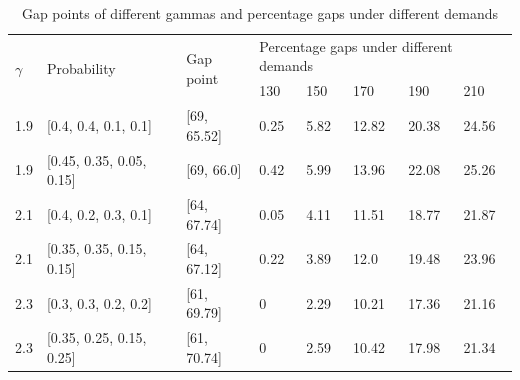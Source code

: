 \begin{table}[]
  \centering
  \caption{Gap points of different gammas and percentage gaps under different demands}
\begin{tabular}{llllllll}
  \hline
  \multicolumn{1}{|l|}{\multirow{2}{*}{$\gamma$}} & \multicolumn{1}{|l|}{\multirow{2}{*}{Probability}} & \multicolumn{1}{l|}{\multirow{2}{*}{Gap point}} & \multicolumn{5}{l|}{Percentage gaps under different demands}   \\ 
  \cline{4-8} 
  \multicolumn{1}{|l|}{} & \multicolumn{1}{l|}{} & \multicolumn{1}{l|}{}  & \multicolumn{1}{l|}{130} & \multicolumn{1}{l|}{150} & \multicolumn{1}{l|}{170} & \multicolumn{1}{l|}{190} & \multicolumn{1}{l|}{210} \\ 
  \hline
  \multicolumn{1}{|l|}{1.9} & \multicolumn{1}{l|}{[0.4, 0.4, 0.1, 0.1]}  & \multicolumn{1}{l|}{[69, 65.52]}  & \multicolumn{1}{l|}{0.25}  & \multicolumn{1}{l|}{5.82}  & \multicolumn{1}{l|}{12.82} & \multicolumn{1}{l|}{20.38} & \multicolumn{1}{l|}{24.56} \\
  \hline
  \multicolumn{1}{|l|}{1.9}  & \multicolumn{1}{l|}{[0.45, 0.35, 0.05, 0.15]}  & \multicolumn{1}{l|}{[69, 66.0]}  & \multicolumn{1}{l|}{0.42}  & \multicolumn{1}{l|}{5.99}  & \multicolumn{1}{l|}{13.96} & \multicolumn{1}{l|}{22.08} & \multicolumn{1}{l|}{25.26} \\ 
  \hline                                    
  \multicolumn{1}{|l|}{2.1}  & \multicolumn{1}{l|}{[0.4, 0.2, 0.3, 0.1]} & \multicolumn{1}{l|}{[64, 67.74]}  & \multicolumn{1}{l|}{0.05}  & \multicolumn{1}{l|}{4.11}  & \multicolumn{1}{l|}{11.51} & \multicolumn{1}{l|}{18.77} & \multicolumn{1}{l|}{21.87} \\
  \hline 
  \multicolumn{1}{|l|}{2.1}  & \multicolumn{1}{l|}{[0.35, 0.35, 0.15, 0.15]} & \multicolumn{1}{l|}{[64, 67.12]}  & \multicolumn{1}{l|}{0.22}  & \multicolumn{1}{l|}{3.89}  & \multicolumn{1}{l|}{12.0} & \multicolumn{1}{l|}{19.48} & \multicolumn{1}{l|}{23.96} \\
  \hline       
  \multicolumn{1}{|l|}{2.3}  & \multicolumn{1}{l|}{[0.3, 0.3, 0.2, 0.2]} & \multicolumn{1}{l|}{[61, 69.79]}  & \multicolumn{1}{l|}{0}  & \multicolumn{1}{l|}{2.29}  & \multicolumn{1}{l|}{10.21} & \multicolumn{1}{l|}{17.36} & \multicolumn{1}{l|}{21.16} \\
  \hline
  \multicolumn{1}{|l|}{2.3}  & \multicolumn{1}{l|}{[0.35, 0.25, 0.15, 0.25]} & \multicolumn{1}{l|}{[61, 70.74]}  & \multicolumn{1}{l|}{0}  & \multicolumn{1}{l|}{2.59}  & \multicolumn{1}{l|}{10.42} & \multicolumn{1}{l|}{17.98} & \multicolumn{1}{l|}{21.34} \\ 

\end{tabular}
\end{table}
